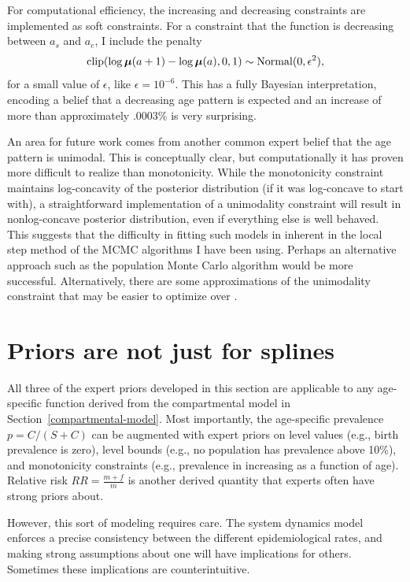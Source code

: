 For computational efficiency, the increasing and decreasing
constraints are implemented as soft constraints.  For a constraint
that the function is decreasing between $a_s$ and $a_e$, I include the penalty
\[
\operatorname{clip}(\log \boldsymbol{\mu}(a+1) - \log \boldsymbol{\mu}(a), 0, 1) \sim \operatorname{Normal}(0, \epsilon^2),
\]
for a small value of $\epsilon$, like $\epsilon = 10^{-6}$.  This has
a fully Bayesian interpretation, encoding a belief that a decreasing age pattern is expected
and an increase of more than approximately .0003\% is very surprising.


An area for future work comes from another common expert belief that
the age pattern is unimodal.  This is conceptually clear, but
computationally it has proven more difficult to realize than
monotonicity.  While the monotonicity constraint maintains
log-concavity of the posterior distribution (if it was log-concave to
start with), a straightforward implementation of a unimodality
constraint will result in nonlog-concave posterior distribution, even
if everything else is well behaved.  This suggests that the difficulty
in fitting such models in inherent in the local step method of the
MCMC algorithms I have been using.  Perhaps an alternative approach
such as the population Monte Carlo algorithm would be more successful.
Alternatively, there are some approximations of the unimodality
constraint that may be easier to optimize over \cite{Papp[KP6]]}.

\section{Priors are not just for splines}
All three of the expert priors developed in this section are
applicable to any age-specific function derived from the compartmental
model in Section~\ref{compartmental-model}. Most importantly, the
age-specific prevalence $p = C/(S+C)$ can be augmented with expert
priors on level values (e.g., birth prevalence is zero), level bounds
(e.g., no population has prevalence above 10\%), and monotonicity
constraints (e.g., prevalence in increasing as a function of
age). Relative risk $RR = \frac{m+f}{m}$ is another derived quantity that
experts often have strong priors about.

However, this sort of modeling requires care. The system dynamics
model enforces a precise consistency between the different
epidemiological rates, and making strong assumptions about one will
have implications for others.  Sometimes these implications are
counterintuitive.

